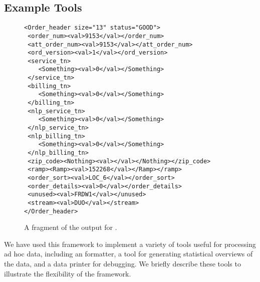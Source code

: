 \subsection{Example Tools}
\label{sec:gentool-motivation-ex}

\begin{figure}
  \centering
  \scriptsize
\begin{verbatim}
<Order_header size="13" status="GOOD">
 <order_num><val>9153</val></order_num>
 <att_order_num><val>9153</val></att_order_num>
 <ord_version><val>1</val></ord_version>
 <service_tn>
    <Something><val>0</val></Something>
 </service_tn>
 <billing_tn>
    <Something><val>0</val></Something>
 </billing_tn>
 <nlp_service_tn>
    <Something><val>0</val></Something>
 </nlp_service_tn>
 <nlp_billing_tn>
    <Something><val>0</val></Something>
 </nlp_billing_tn>
 <zip_code><Nothing><val></val></Nothing></zip_code>
 <ramp><Ramp><val>152268</val></Ramp></ramp>
 <order_sort><val>LOC_6</val></order_sort>
 <order_details><val>0</val></order_details>
 <unused><val>FRDW1</val></unused>
 <stream><val>DUO</val></stream>
</Order_header>
\end{verbatim}  
  \caption{A fragment of the \xml{} output for \dibbler{}. }
  \label{fig:gentool-xml-output}
\end{figure}

We have used this framework to implement a variety of tools useful for processing ad hoc data, including an \xml{} formatter, a tool for generating statistical overviews of the data, and a data printer for debugging.  We briefly describe these tools to illustrate the flexibility of the framework.

